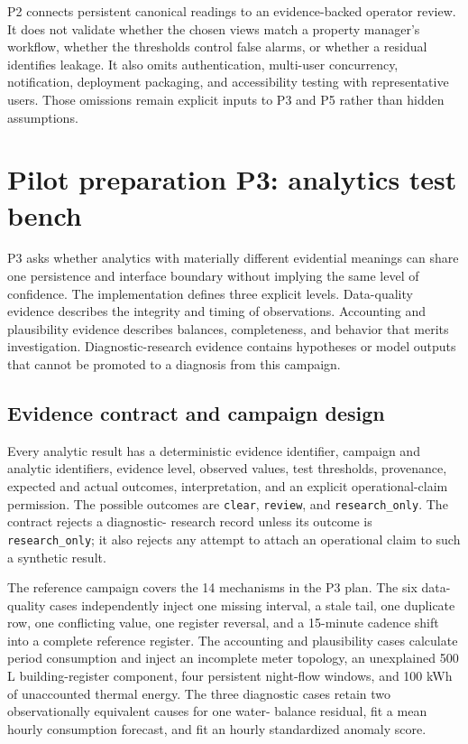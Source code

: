 \documentclass[11pt,a4paper]{article}
\begin{document}
P2 connects persistent canonical readings to an evidence-backed operator
review. It does not validate whether the chosen
views match a property manager's workflow, whether the thresholds control false
alarms, or whether a residual identifies leakage. It also omits authentication,
multi-user concurrency, notification, deployment packaging, and accessibility
testing with representative users. Those omissions remain explicit inputs to
P3 and P5 rather than hidden assumptions.

\FloatBarrier
\section{Pilot preparation P3: analytics test bench}
P3 asks whether analytics with materially different evidential meanings can
share one persistence and interface boundary without implying the same level of
confidence. The implementation defines three explicit levels. Data-quality
evidence describes the integrity and timing of observations. Accounting and
plausibility evidence describes balances, completeness, and behavior that
merits investigation. Diagnostic-research evidence contains hypotheses or
model outputs that cannot be promoted to a diagnosis from this campaign.

\subsection{Evidence contract and campaign design}
Every analytic result has a deterministic evidence identifier, campaign and
analytic identifiers, evidence level, observed values, test thresholds,
provenance, expected and actual outcomes, interpretation, and an explicit
operational-claim permission. The possible outcomes are \texttt{clear},
\texttt{review}, and \texttt{research\_only}. The contract rejects a diagnostic-
research record unless its outcome is \texttt{research\_only}; it also rejects
any attempt to attach an operational claim to such a synthetic result.

The reference campaign covers the 14 mechanisms in the P3 plan. The six
data-quality cases independently inject one missing interval, a stale tail, one
duplicate row, one conflicting value, one register reversal, and a 15-minute
cadence shift into a complete reference register. The accounting and
plausibility cases calculate period consumption and inject an incomplete meter
topology, an unexplained 500 L building-register component, four persistent
night-flow windows, and 100 kWh of unaccounted thermal energy. The three
diagnostic cases retain two observationally equivalent causes for one water-
balance residual, fit a mean hourly consumption forecast, and fit an hourly
standardized anomaly score.
\end{document}
